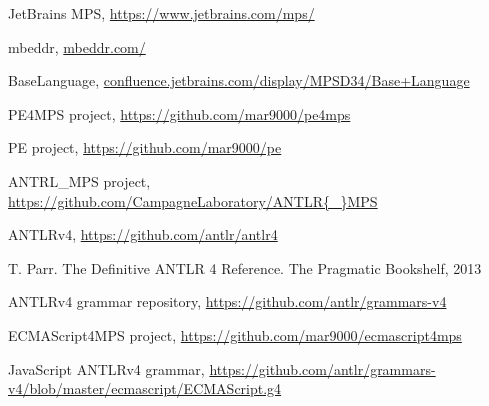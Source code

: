 \documentclass[10pt]{sigplanconf}
\begin{document}
\begin{thebibliography}{}

 JetBrains MPS, \url{https://www.jetbrains.com/mps/}

 mbeddr, \url{mbeddr.com/}

 BaseLanguage, \url{confluence.jetbrains.com/display/MPSD34/Base+Language}

 PE4MPS project, \url{https://github.com/mar9000/pe4mps}

 PE project, \url{https://github.com/mar9000/pe}

 ANTRL{\_}MPS project, \url{https://github.com/CampagneLaboratory/ANTLR{\_}MPS}

 ANTLRv4, \url{https://github.com/antlr/antlr4}

 T. Parr. The Definitive ANTLR 4 Reference. The Pragmatic Bookshelf, 2013

 ANTLRv4 grammar repository, \url{https://github.com/antlr/grammars-v4}

 ECMAScript4MPS project, \url{https://github.com/mar9000/ecmascript4mps}

 JavaScript ANTLRv4 grammar, \url{https://github.com/antlr/grammars-v4/blob/master/ecmascript/ECMAScript.g4}

\end{thebibliography}
\end{document}
